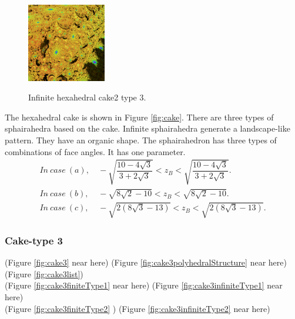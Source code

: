 \documentclass[suppldata, dvipdfmx]{interact}
\theoremstyle{plain}%
\theoremstyle{definition}
\theoremstyle{remark}
\theoremstyle{problemstyle}
\begin{document}
\begin{figure}[H]
\begin{minipage}{0.5\textwidth}
\begin{minipage}[t]{0.24\textwidth}
  \end{minipage}
  \hspace*{\fill}
  \begin{minipage}[t]{0.24\textwidth}
   \centering
   \includegraphics[width=1.35in, height=1.35in,
   keepaspectratio]{./img/sphairahedron/hexahedralCake2/limitsetInf_c.jpg} 
   \label{fig:cake2type3infiniteLimitset}
  \end{minipage}
  \hspace*{\fill}
  \caption{Infinite hexahedral cake2 type 3.}
  \label{fig:cake2Type3infinite}
 \end{minipage}
\end{figure}

The hexahedral cake is shown in Figure \ref{fig:cake}. There are three
types of sphairahedra based on the cake.
Infinite sphairahedra generate a landscape-like pattern.
They have an organic shape.
The sphairahedron has three types of combinations of face angles.
It has one parameter.
\begin{align*}
 In~case~(a),&~- \sqrt{\dfrac{10 - 4 \sqrt{3}}{3 + 2 \sqrt{3}}} < z_B <\sqrt{\dfrac{10 - 4 \sqrt{3}}{3 + 2 \sqrt{3}}}.\\ 
 In~case~(b),&~-\sqrt{8\sqrt{2}-10} < z_B < \sqrt{8\sqrt{2} - 10}.\\
 In~case~(c),&~-\sqrt{2(8\sqrt{3} - 13)} < z_B < \sqrt{2(8\sqrt{3} - 13)}.
\end{align*}

\subsubsection{Cake-type 3}

\noindent(Figure \ref{fig:cake3} near here)
(Figure \ref{fig:cake3polyhedralStructure} near here)\\
(Figure \ref{fig:cake3list})\\
(Figure \ref{fig:cake3finiteType1}
 near here)
(Figure \ref{fig:cake3infiniteType1}
 near here)\\
(Figure \ref{fig:cake3finiteType2}
)
(Figure \ref{fig:cake3infiniteType2}
 near here)
\end{document}
